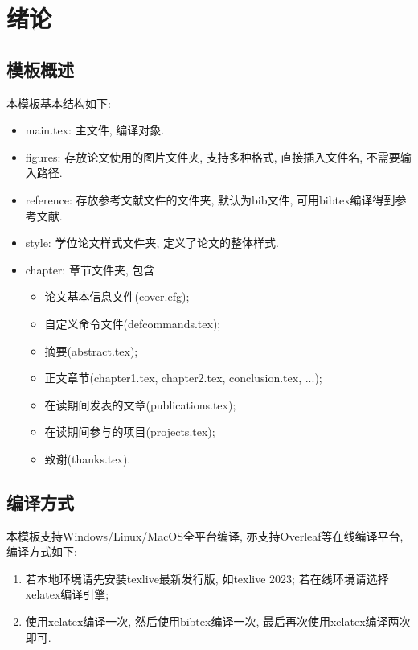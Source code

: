 \chapter{绪论} 
\label{chapter:Introduction}

\section{模板概述}
本模板基本结构如下:

\begin{itemize}
\item main.tex: 主文件, 编译对象.
\item figures: 存放论文使用的图片文件夹, 支持多种格式, 直接插入文件名, 不需要输入路径.
\item reference: 存放参考文献文件的文件夹, 默认为bib文件, 可用bibtex编译得到参考文献.
\item style: 学位论文样式文件夹, 定义了论文的整体样式.
\item chapter: 章节文件夹, 包含
\begin{itemize}
\item 论文基本信息文件(cover.cfg);
\item 自定义命令文件(defcommands.tex);
\item 摘要(abstract.tex);
\item 正文章节(chapter1.tex, chapter2.tex, conclusion.tex, ...);
\item 在读期间发表的文章(publications.tex);
\item 在读期间参与的项目(projects.tex);
\item 致谢(thanks.tex).
\end{itemize}
\end{itemize}

\section{编译方式}
本模板支持Windows/Linux/MacOS全平台编译, 亦支持Overleaf等在线编译平台, 编译方式如下:
\begin{enumerate}
\item 若本地环境请先安装texlive最新发行版, 如texlive 2023; 若在线环境请选择xelatex编译引擎;
\item 使用xelatex编译一次, 然后使用bibtex编译一次, 最后再次使用xelatex编译两次即可.
\end{enumerate}

